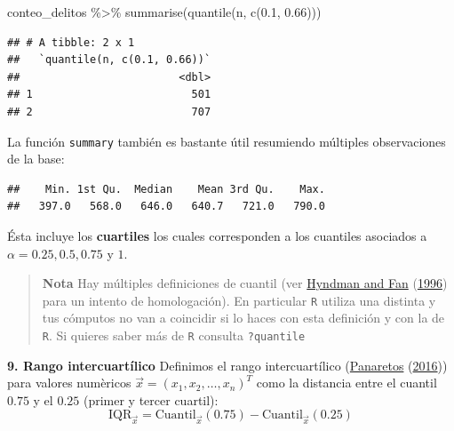 \documentclass[
]{book}
\newenvironment{Shaded}{\begin{snugshade}}{\end{snugshade}}
\newcommand{\FloatTok}[1]{\textcolor[rgb]{0.00,0.00,0.81}{#1}}
\newcommand{\FunctionTok}[1]{\textcolor[rgb]{0.00,0.00,0.00}{#1}}
\newcommand{\NormalTok}[1]{#1}
\newcommand{\SpecialCharTok}[1]{\textcolor[rgb]{0.00,0.00,0.00}{#1}}
\begin{document}
\begin{Shaded}
\begin{Highlighting}[]
\NormalTok{conteo\_delitos }\SpecialCharTok{\%\textgreater{}\%} \FunctionTok{summarise}\NormalTok{(}\FunctionTok{quantile}\NormalTok{(n, }\FunctionTok{c}\NormalTok{(}\FloatTok{0.1}\NormalTok{, }\FloatTok{0.66}\NormalTok{)))}
\end{Highlighting}
\end{Shaded}

\begin{verbatim}
## # A tibble: 2 x 1
##   `quantile(n, c(0.1, 0.66))`
##                         <dbl>
## 1                         501
## 2                         707
\end{verbatim}

La función \texttt{summary} también es bastante útil resumiendo múltiples observaciones de la base:

\begin{Shaded}
\end{Shaded}

\begin{verbatim}
##    Min. 1st Qu.  Median    Mean 3rd Qu.    Max. 
##   397.0   568.0   646.0   640.7   721.0   790.0
\end{verbatim}

Ésta incluye los \textbf{cuartiles} los cuales corresponden a los cuantiles asociados a \(\alpha =0.25, 0.5, 0.75\) y \(1\).

\begin{quote}
\textbf{Nota} Hay múltiples definiciones de cuantil (ver \protect\hyperlink{ref-hyndman1996sample}{Hyndman and Fan} (\protect\hyperlink{ref-hyndman1996sample}{1996}) para un intento de homologación). En particular \texttt{R} utiliza una distinta y tus cómputos no van a coincidir si lo haces con esta definición y con la de \texttt{R}. Si quieres saber más de \texttt{R} consulta \texttt{?quantile}
\end{quote}

\textbf{9. Rango intercuartílico} Definimos el rango intercuartílico (\protect\hyperlink{ref-panaretos2016statistics}{Panaretos} (\protect\hyperlink{ref-panaretos2016statistics}{2016})) para valores numèricos \(\vec{x} = (x_1, x_2, \dots, x_n)^T\) como la distancia entre el cuantil \(0.75\) y el \(0.25\) (primer y tercer cuartil):
\[
\text{IQR}_{\vec{x}} = \text{Cuantil}_{\vec{x}}(0.75) -  \text{Cuantil}_{\vec{x}}(0.25)
\]
\end{document}
